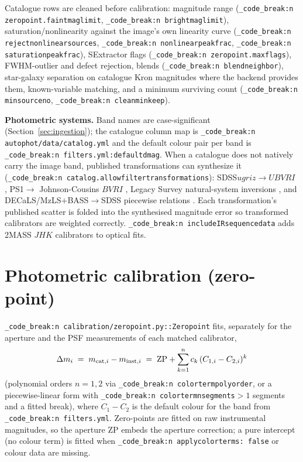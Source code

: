 \documentclass[11pt,a4paper]{article}
\renewcommand{\_}{\autophotunderscore\allowbreak}
\DeclareRobustCommand{\code}[1]{\texttt{\autophot_code_break:n {#1}}}
\begin{document}
Catalogue rows are cleaned before calibration: magnitude range
(\code{zeropoint.faint\_mag\_limit}, \code{bright\_mag\_limit}),
saturation/nonlinearity against the image's own linearity curve
(\code{reject\_nonlinear\_sources}, \code{nonlinear\_peak\_frac},
\code{saturation\_peak\_frac}), SExtractor flags
(\code{zeropoint.max\_flags}), FWHM-outlier and defect rejection, blends
(\code{blend\_neighbor\_*}), star-galaxy separation on catalogue Kron
magnitudes \citep{kron1980} where the backend provides them,
known-variable matching, and a minimum
surviving count (\code{min\_source\_no}, \code{clean\_min\_keep}).

\textbf{Photometric systems.} Band names are case-significant
(Section~\ref{sec:ingestion}); the catalogue column map is
\code{autophot/data/catalog.yml} and the default colour pair per band is
\code{filters.yml:default\_dmag}. When a catalogue does not natively
carry the image band, published transformations can synthesize it
(\code{catalog.allow\_filter\_transformations}): SDSS$ugriz\to UBVRI$
\citep{lupton2005sdss,jester2005}, PS1$\to$ Johnson-Cousins $BVRI$
\citep{tonry2012ps1}, Legacy Survey natural-system inversions
\citep{legacydr10}, and DECaLS/MzLS$+$BASS$\to$SDSS piecewise relations
\citep{toptun2024}. Each transformation's published scatter is folded
into the synthesised magnitude error so transformed calibrators are
weighted correctly. \code{include\_IR\_sequence\_data} adds 2MASS $JHK$
calibrators to optical fits.

\section{Photometric calibration (zero-point)}
\label{sec:zeropoint}

\code{calibration/zeropoint.py::Zeropoint} fits, separately for the
aperture and the PSF measurements of each matched calibrator,
\begin{equation}
\Delta m_i \;=\; m_{{\rm cat},i}-m_{{\rm inst},i}
\;=\; \mathrm{ZP}+\sum_{k=1}^{n} c_k\,(C_{1,i}-C_{2,i})^{k}
\end{equation}
(polynomial orders $n=1,2$ via \code{color\_term\_poly\_order}, or a
piecewise-linear form with \code{color\_term\_n\_segments}$>1$ segments
and a fitted break), where $C_{1}-C_{2}$ is the default colour for the
band from \code{filters.yml}. Zero-points are fitted on raw instrumental
magnitudes, so the aperture ZP embeds the aperture correction; a pure
intercept (no colour term) is fitted when
\code{apply\_colorterms: false} or colour data are missing.
\end{document}
